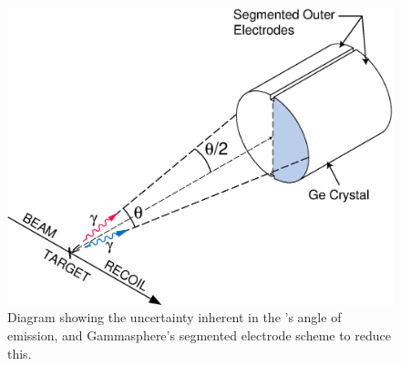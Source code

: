\begin{figure}
	\centerline{\includegraphics[height=0.3\textheight]{./img/c3/split_contact.eps}}
	\caption{Diagram showing the uncertainty inherent in the \gr{}'s angle of emission, and Gammasphere's segmented electrode scheme to reduce this.}
	\label{fig:chp3-doppler-split-contact}
\end{figure}

